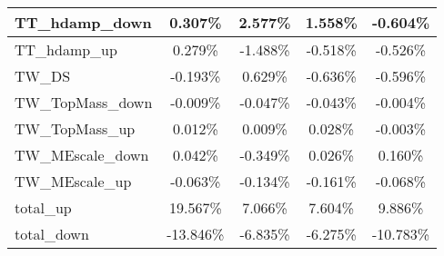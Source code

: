 \begin{table}[]
{\begin{tabular}{|l|c|c|c|c|}
TT\_hdamp\_down                  & 0.307\%                         & 2.577\%                      & 1.558\%                        & -0.604\%                   \\ \hline
TT\_hdamp\_up                    & 0.279\%                           & -1.488\%                        & -0.518\%                          & -0.526\%                     \\ \hline
TW\_DS                      & -0.193\%                             & 0.629\%                          & -0.636\%                            & -0.596\%                       \\ \hline
TW\_TopMass\_down                & -0.009\%                       & -0.047\%                    & -0.043\%                      & -0.004\%                 \\ \hline
TW\_TopMass\_up                & 0.012\%                       & 0.009\%                    & 0.028\%                      & -0.003\%                 \\ \hline
TW\_MEscale\_down             & 0.042\%                    & -0.349\%                 & 0.026\%                   & 0.160\%              \\ \hline
TW\_MEscale\_up               & -0.063\%                      & -0.134\%                   & -0.161\%                     & -0.068\%                \\ \hline
total\_up                          & 19.567\%                           & 7.066\%                           & 7.604\%                          & 9.886\%                           \\ \hline 
total\_down                        & -13.846\%                         & -6.835\%                         & -6.275\%                        & -10.783\%                         \\ \hline \hline 
\end{tabular}}
\end{table}
